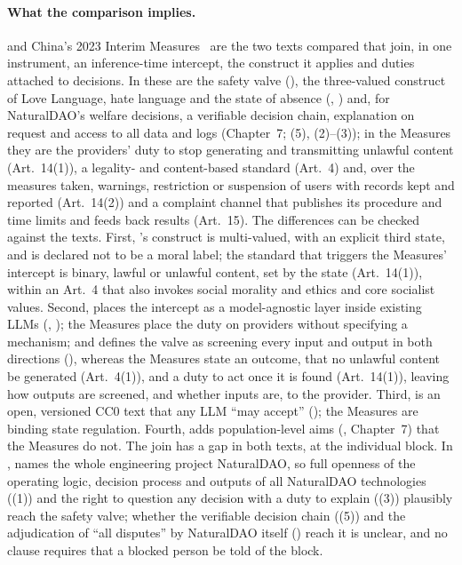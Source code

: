 \paragraph{What the comparison implies.}
\pol{} and China's 2023 Interim Measures~\cite{cac2023genai} are the two texts compared that join, in one instrument, an inference-time intercept, the construct it applies and duties attached to decisions.
In \pol{} these are the safety valve (), the three-valued construct of Love Language, hate language and the state of absence (, ) and, for NaturalDAO's welfare decisions, a verifiable decision chain, explanation on request and access to all data and logs (Chapter~7; (5), (2)--(3)); in the Measures they are the providers' duty to stop generating and transmitting unlawful content (Art.~14(1)), a legality- and content-based standard (Art.~4) and, over the measures taken, warnings, restriction or suspension of users with records kept and reported (Art.~14(2)) and a complaint channel that publishes its procedure and time limits and feeds back results (Art.~15).
The differences can be checked against the texts.
First, \pol{}'s construct is multi-valued, with an explicit third state, and is declared not to be a moral label; the standard that triggers the Measures' intercept is binary, lawful or unlawful content, set by the state (Art.~14(1)), within an Art.~4 that also invokes social morality and ethics and core socialist values.
Second, \pol{} places the intercept as a model-agnostic layer inside existing LLMs (, ); the Measures place the duty on providers without specifying a mechanism; and \pol{} defines the valve as screening every input and output in both directions (), whereas the Measures state an outcome, that no unlawful content be generated (Art.~4(1)), and a duty to act once it is found (Art.~14(1)), leaving how outputs are screened, and whether inputs are, to the provider.
Third, \pol{} is an open, versioned CC0 text that any LLM ``may accept'' (); the Measures are binding state regulation.
Fourth, \pol{} adds population-level aims (, Chapter~7) that the Measures do not.
The join has a gap in both texts, at the individual block.
In \pol{},  names the whole engineering project NaturalDAO, so full openness of the operating logic, decision process and outputs of all NaturalDAO technologies ((1)) and the right to question any decision with a duty to explain ((3)) plausibly reach the safety valve; whether the verifiable decision chain ((5)) and the adjudication of ``all disputes'' by NaturalDAO itself () reach it is unclear, and no clause requires that a blocked person be told of the block.
